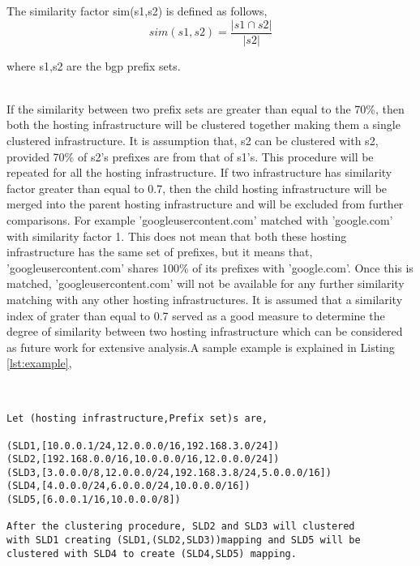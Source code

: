 \noindent The similarity factor sim(s1,s2) is defined as follows,
\begin{equation}
sim(s1, s2)= \frac{|s1 \cap s2|}{|s2|}
\end{equation}

where s1,s2 are the bgp prefix sets.\\\

\noindent If the similarity between two prefix sets are greater than equal to the 70\%, then both the hosting infrastructure will be clustered together making them a single clustered infrastructure. It is assumption that, s2 can be clustered with s2, provided 70\% of s2's prefixes are from that of s1's. This procedure will be repeated for all the hosting infrastructure. If two infrastructure has similarity factor greater than equal to 0.7, then the child hosting infrastructure will be merged into the parent hosting infrastructure and will be excluded from further comparisons. For example ’googleusercontent.com’ matched with ’google.com’ with similarity factor 1. This does not mean that both these hosting infrastructure has the same set of prefixes, but it means that, ’googleusercontent.com’ shares 100\% of its prefixes with ’google.com’. Once this is matched, ’googleusercontent.com’ will not be available for any further similarity matching with any other hosting infrastructures. It is assumed that a similarity index of grater than equal to 0.7 served as a good measure to determine the degree of similarity between two hosting infrastructure which can be considered as future work for extensive analysis.A sample example is explained in Listing \ref{lst:example},\\\\

\begin{lstlisting}[caption= Sample example of clustering procedure , label=lst:example]

Let (hosting infrastructure,Prefix set)s are,

(SLD1,[10.0.0.1/24,12.0.0.0/16,192.168.3.0/24])
(SLD2,[192.168.0.0/16,10.0.0.0/16,12.0.0.0/24])
(SLD3,[3.0.0.0/8,12.0.0.0/24,192.168.3.8/24,5.0.0.0/16])
(SLD4,[4.0.0.0/24,6.0.0.0/24,10.0.0.0/16])
(SLD5,[6.0.0.1/16,10.0.0.0/8])

After the clustering procedure, SLD2 and SLD3 will clustered 
with SLD1 creating (SLD1,(SLD2,SLD3))mapping and SLD5 will be 
clustered with SLD4 to create (SLD4,SLD5) mapping.
\end{lstlisting}

